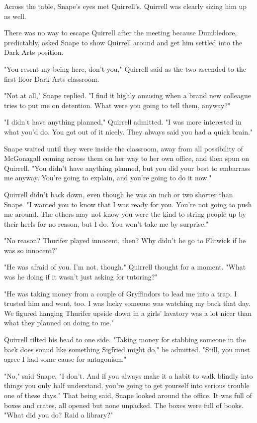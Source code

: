 Across the table, Snape's eyes met Quirrell's. Quirrell was clearly sizing him up as well.

There was no way to escape Quirrell after the meeting because Dumbledore, predictably, asked Snape to show Quirrell around and get him settled into the Dark Arts position.

"You resent my being here, don't you," Quirrell said as the two ascended to the first floor Dark Arts classroom.

"Not at all," Snape replied. "I find it highly amusing when a brand new colleague tries to put me on detention. What were you going to tell them, anyway?"

"I didn't have anything planned," Quirrell admitted. "I was more interested in what you'd do. You got out of it nicely. They always said you had a quick brain."

Snape waited until they were inside the classroom, away from all possibility of McGonagall coming across them on her way to her own office, and then spun on Quirrell. "You didn't have anything planned, but you did your best to embarrass me anyway. You're going to explain, and you're going to do it now."

Quirrell didn't back down, even though he was an inch or two shorter than Snape. "I wanted you to know that I was ready for you. You're not going to push me around. The others may not know you were the kind to string people up by their heels for no reason, but I do. You won't take me by surprise."

"No reason? Thurifer played innocent, then? Why didn't he go to Flitwick if he was so innocent?"

"He was afraid of you. I'm not, though." Quirrell thought for a moment. "What was he doing if it wasn't just asking for tutoring?"

"He was taking money from a couple of Gryffindors to lead me into a trap. I trusted him and went, too. I was lucky someone was watching my back that day. We figured hanging Thurifer upside down in a girls' lavatory was a lot nicer than what they planned on doing to me."

Quirrell tilted his head to one side. "Taking money for stabbing someone in the back does sound like something Sigfried might do," he admitted. "Still, you must agree I had some cause for antagonism."

"No," said Snape, "I don't. And if you always make it a habit to walk blindly into things you only half understand, you're going to get yourself into serious trouble one of these days." That being said, Snape looked around the office. It was full of boxes and crates, all opened but none unpacked. The boxes were full of books. "What did you do? Raid a library?"

